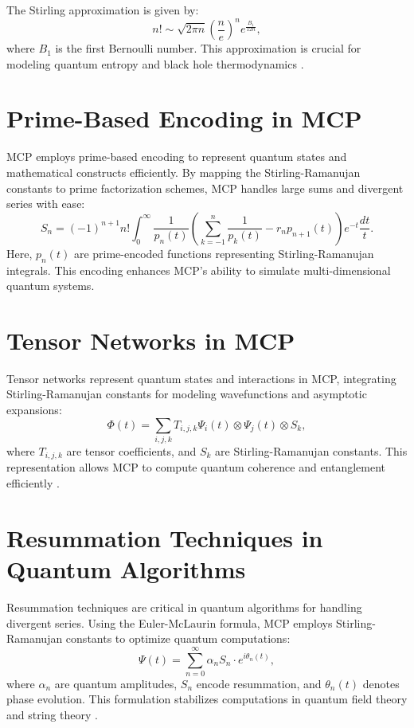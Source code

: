 \documentclass{article}
\theoremstyle{plain}
\begin{document}
The Stirling approximation is given by:
\begin{equation}
n! \sim \sqrt{2 \pi n} \left(\frac{n}{e}\right)^n e^{\frac{B_1}{12n}},
\end{equation}
where $B_1$ is the first Bernoulli number. This approximation is crucial for modeling quantum entropy and black hole thermodynamics \cite{Bekenstein1973, Hawking1975}.

\section{Prime-Based Encoding in MCP}
MCP employs prime-based encoding to represent quantum states and mathematical constructs efficiently. By mapping the Stirling-Ramanujan constants to prime factorization schemes, MCP handles large sums and divergent series with ease:
\begin{equation}
S_n = (-1)^{n+1} n! \int_0^{\infty} \frac{1}{p_n(t)} \left( \sum_{k=-1}^n \frac{1}{p_k(t)} - r_n p_{n+1}(t) \right) e^{-t} \frac{dt}{t}.
\end{equation}
Here, $p_n(t)$ are prime-encoded functions representing Stirling-Ramanujan integrals. This encoding enhances MCP's ability to simulate multi-dimensional quantum systems.

\section{Tensor Networks in MCP}
Tensor networks represent quantum states and interactions in MCP, integrating Stirling-Ramanujan constants for modeling wavefunctions and asymptotic expansions:
\begin{equation}
\Phi(t) = \sum_{i,j,k} T_{i,j,k} \Psi_i(t) \otimes \Psi_j(t) \otimes S_k,
\end{equation}
where $T_{i,j,k}$ are tensor coefficients, and $S_k$ are Stirling-Ramanujan constants. This representation allows MCP to compute quantum coherence and entanglement efficiently \cite{Heisenberg1927, Feynman1965}.

\section{Resummation Techniques in Quantum Algorithms}
Resummation techniques are critical in quantum algorithms for handling divergent series. Using the Euler-McLaurin formula, MCP employs Stirling-Ramanujan constants to optimize quantum computations:
\begin{equation}
\Psi(t) = \sum_{n=0}^\infty \alpha_n S_n \cdot e^{i \theta_n(t)},
\end{equation}
where $\alpha_n$ are quantum amplitudes, $S_n$ encode resummation, and $\theta_n(t)$ denotes phase evolution. This formulation stabilizes computations in quantum field theory and string theory \cite{Kaluza1921, Rovelli2004}.
\end{document}
